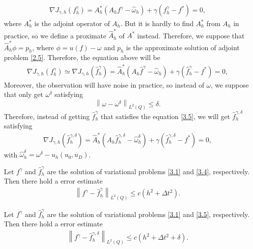\documentclass[twocolumn]{article}
\begin{document}
\begin{align}\label{3.3}
\nabla J_{\gamma, h}(f^\gamma_h)= A_h^*(A_hf^\gamma-\hat{\omega}_h)+\gamma(f^\gamma_h-f^*)=0,
\end{align}
where $A_h^*$ is the adjoint operator of $A_h$. But it is hardly to find $A^*_h$ from $A_h$ in practice, so we define a proximate $\hat{A}_h^*$ of $A^*$ instead. Therefore, we suppose that $\hat{A}^*_h\phi=p_h$, where $\phi= u(f) - \omega$ and $p_h$ is the approximate solution of adjoint problem \eqref{2.5}. Therefore, the equation above will be
\begin{align}\label{3.4}
\nabla J_{\gamma, h}(f^\gamma_h)\simeq\nabla J_{\gamma, h}(\hat{f}^\gamma_h)= \hat{A}_h^*(A_h\hat{f}^\gamma-\hat{\omega}_h)+\gamma(\hat{f}^\gamma_h-f^*)=0,
\end{align}
Moreover, the observation will have noise in practice, so instead of $\omega$, we suppose that only get $\omega^{\delta}$ satisfying
$$\left\| \omega-\omega^\delta\right\|_{L^2(Q)}\leq \delta.$$
Therefore, instead of getting $\hat{f}^\gamma_h$ that satisfies the equation \eqref{3.5}, we will get $\hat{f}^{\gamma, \delta}_h$ satisfying
\begin{align}\label{3.5}
\nabla J_{\gamma, h}\left(\hat{f}^{\gamma, \delta}_h\right)= \hat{A}_h^*(A_h\hat{f}^{\gamma, \delta}_h-\hat{\omega}_h^\delta)+\gamma(\hat{f}^{\gamma, \delta}_h-f^*)=0,
\end{align}
with $\hat{\omega}_h^\delta=\omega^\delta- u_h(u_0, u_D)$.

\begin{dl}\label{dl3.3}
	Let $f^\gamma$ and $\hat{f}^\gamma_h$ are the solution of variational problems \eqref{3.1} and \eqref{3.4}, respectively. Then there hold a error estimate
	\begin{align}\label{3.11}
	\left\|f^\gamma-\hat{f}^\gamma_h \right\|_{L^2(Q)}\leq c(h^2+\Delta t^2).
	\end{align}
\end{dl}

\begin{cy}\label{cy3.1}
	Let $f^\gamma$ and $\hat{f}^\gamma_h$ are the solution of variational problems \eqref{3.1} and \eqref{3.5}, respectively. Then there hold a error estimate
	\begin{align}\label{3.12}
	\left\|f^\gamma-\hat{f}^{\gamma, \delta}_h \right\|_{L^2(Q)}\leq c(h^2+\Delta t^2+\delta).
	\end{align}
\end{cy}


\end{document}
